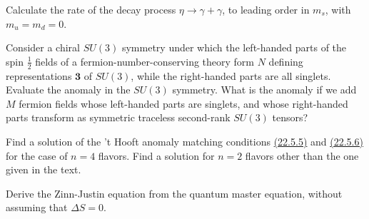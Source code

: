 
\begin{enumerate}
 Calculate the rate of the decay process $\eta\to\gamma+\gamma$, to
leading order in $m_s$, with $m_u=m_d=0$.

 Consider a chiral $SU(3)$ symmetry under which the left-handed parts
of the spin $\frac{1}{2}$ fields of a fermion-number-conserving theory form
$N$ defining representations $\boldsymbol{3}$ of $SU(3)$, while the
right-handed parts are all singlets. Evaluate the anomaly in the $SU(3)$
symmetry. What is the anomaly if we add $M$ fermion fields whose left-handed
parts are singlets, and whose right-handed parts transform as symmetric
traceless second-rank $SU(3)$ tensors?

 Find a solution of the 't Hooft anomaly matching conditions
\hyperref[eq:22.5.5]{(22.5.5)} and \hyperref[eq:22.5.6]{(22.5.6)} for the
case of $n=4$ flavors. Find a solution for $n=2$ flavors other than the one
given in the text.

 Derive the Zinn-Justin equation from the quantum master equation,
without assuming that $\Delta S=0$.
\end{enumerate}
